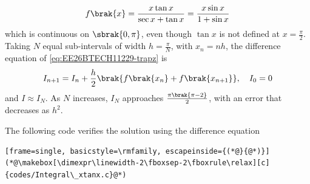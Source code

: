 \begin{enumerate}[label=\thesubsection.\arabic*, ref=\thesubsection.\theenumi]
\begin{align}
	f\brak{x} = \frac{x\tan x}{\sec x + \tan x} = \frac{x\sin x}{1 + \sin x}
\end{align}
which is continuous on $\sbrak{0, \pi}$, even though $\tan x$ is not defined at $x = \frac{\pi}{2}$. Taking $N$ equal sub-intervals of width $h = \frac{\pi}{N}$, with $x_n = nh$, the difference equation of \eqref{eq:EE26BTECH11229-trapz} is
\begin{align}
	I_{n+1} = I_n + \frac{h}{2}\brak{f\brak{x_n} + f\brak{x_{n+1}}}, \quad I_0 = 0
\end{align}
and $I \approx I_N$. As $N$ increases, $I_N$ approaches $\frac{\pi\brak{\pi - 2}}{2}$, with an error that decreases as $h^2$.

The following code verifies the solution using the difference equation
\begin{lstlisting}[frame=single, basicstyle=\rmfamily, escapeinside={(*@}{@*)}]
(*@\makebox[\dimexpr\linewidth-2\fboxsep-2\fboxrule\relax][c]{codes/Integral\_xtanx.c}@*)
\end{lstlisting}


\end{enumerate}

